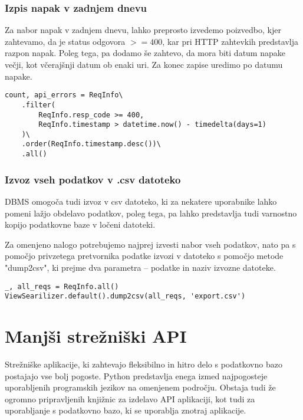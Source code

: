 \documentclass[a4paper,12pt,openright]{book}
\begin{document}
    \subsubsection{Izpis napak v zadnjem dnevu}

    Za nabor napak v zadnjem dnevu, lahko preprosto izvedemo poizvedbo, kjer zahtevamo, da je status odgovora $>= 400$, kar pri HTTP zahtevkih predstavlja razpon napak. Poleg tega, pa dodamo še zahtevo, da mora biti datum napake večji, kot včerajšnji datum ob enaki uri. Za konec zapise uredimo po datumu napake.
    
\begin{verbatim}
count, api_errors = ReqInfo\
    .filter(
        ReqInfo.resp_code >= 400,
        ReqInfo.timestamp > datetime.now() - timedelta(days=1)
    )\
    .order(ReqInfo.timestamp.desc())\
    .all()
\end{verbatim}

    \subsubsection{Izvoz vseh podatkov v .csv datoteko}

    DBMS omogoča tudi izvoz v csv datoteko, ki za nekatere uporabnike lahko pomeni lažjo obdelavo podatkov, poleg tega, pa lahko predstavlja tudi varnostno kopijo podatkovne baze v ločeni datoteki.

    Za omenjeno nalogo potrebujemo najprej izvesti nabor vseh podatkov, nato pa s pomočjo privzetega pretvornika podatke izvozi v datoteko s pomočjo metode "dump2csv", ki prejme dva parametra – podatke in naziv izvozne datoteke.
    
\begin{verbatim}
_, all_reqs = ReqInfo.all()
ViewSearilizer.default().dump2csv(all_reqs, 'export.csv')
\end{verbatim}

    \section{Manjši strežniški API}

    Strežniške aplikacije, ki zahtevajo fleksibilno in hitro delo s podatkovno bazo postajajo vse bolj pogoste. Python predstavlja enega izmed najpogosteje uporabljenih programskih jezikov na omenjenem področju. Obstaja tudi že ogromno pripravljenih knjižnic za izdelavo API aplikaciji, kot tudi za uporabljanje s podatkovno bazo, ki se uporablja znotraj aplikacije.
\end{document}
